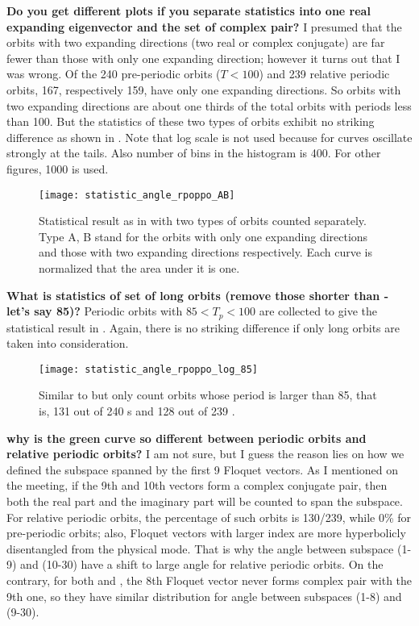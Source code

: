 \begin{description}
\textbf{Do you get different plots if you separate statistics into
one real expanding eigenvector and the set of complex pair?} I presumed that
the orbits with two expanding directions (two real or complex conjugate)
are
far fewer than those with only one expanding direction; however it turns
out that I was wrong. Of the 240 pre-periodic orbits ($T<100$) and
239 relative periodic orbits, 167, respectively 159, have only
one expanding directions. So orbits with two expanding directions are about
one thirds of the total orbits with periods less than 100.
But the statistics
of these two types of orbits exhibit no striking difference as shown in
. Note that log scale is not used
because for curves oscillate strongly at the tails. Also number of bins in the
histogram  is 400. For other figures,
1000 is used.
\begin{figure}[h]
  \centering
  \texttt{[image: statistic\_angle\_rpoppo\_AB]}
  \caption{Statistical result as in 
    with two types of orbits counted separately. Type A, B stand for the
    orbits with only one expanding directions and those with two expanding
    directions respectively. Each curve is normalized that the area under it
    is one.}
  \label{fig:statistic_angle_rpoppo_AB}
\end{figure}

\textbf{What is statistics of set of long orbits
(remove those shorter than - let's say 85)?}
Periodic orbits with $ 85 < T_p < 100$ are collected to give the
statistical result in .
Again, there is no striking difference if only long orbits are taken
into consideration.
\begin{figure}[h]
  \centering
  \texttt{[image: statistic\_angle\_rpoppo\_log\_85]}
  \caption{Similar to  but only count
  orbits whose period is larger than 85, that is, 131 out of 240 s
  and 128 out of 239 .
}
  \label{fig:statistic_angle_rpoppo_log_85}
\end{figure}

\textbf{why is the green curve so different between periodic orbits and relative periodic orbits?}
I am not sure, but I guess the reason lies on how we defined the subspace
spanned by the first 9 Floquet vectors. As I mentioned on the meeting,
if the 9th and 10th vectors form a complex conjugate pair, then both the
real part and the imaginary part will be counted to span the subspace.
For relative periodic orbits, the percentage of such orbits is 130/239, while
0\% for pre-periodic orbits; also, Floquet vectors with larger
index are more hyperbolicly disentangled from the physical mode. That is why
the angle between subspace (1-9) and (10-30) have a shift to large angle for
relative periodic orbits. On the contrary, for both  and ,
the 8th Floquet vector never forms complex pair with the 9th one, so they
have similar distribution for angle between subspaces (1-8) and (9-30).


\end{description}
